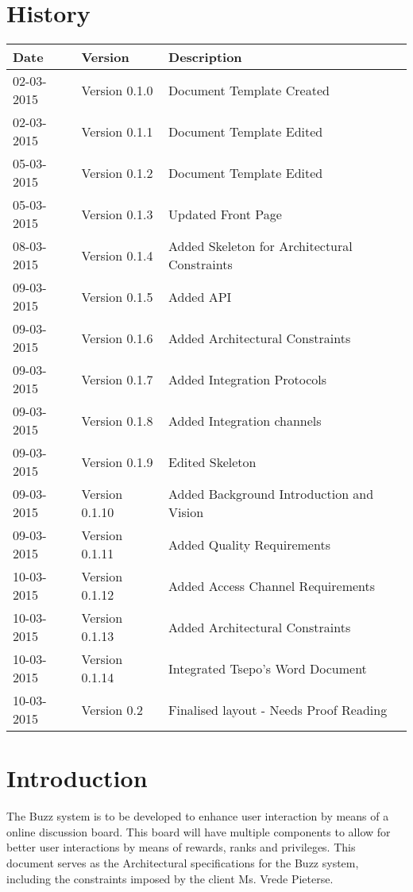 \documentclass[10pt]{article}
\begin{document}


\section{History}
\begin{tabular}{|l|l|l|}

\hline
Date & Version & Description\\ %
\hline
02-03-2015 & Version 0.1.0 & Document Template Created\\ %
02-03-2015 & Version 0.1.1 & Document Template Edited\\ %
05-03-2015 & Version 0.1.2 & Document Template Edited\\ %
05-03-2015 & Version 0.1.3 & Updated Front Page \\ %
08-03-2015 & Version 0.1.4 & Added Skeleton for Architectural Constraints \\ %
09-03-2015 & Version 0.1.5 & Added API \\ %
09-03-2015 & Version 0.1.6 & Added Architectural Constraints \\ %
09-03-2015 & Version 0.1.7 & Added Integration Protocols \\ %
09-03-2015 & Version 0.1.8 & Added Integration channels  \\ %
09-03-2015 & Version 0.1.9 & Edited Skeleton \\ %
09-03-2015 & Version 0.1.10 & Added Background Introduction and Vision \\ %
09-03-2015 & Version 0.1.11 & Added Quality Requirements \\ %
10-03-2015 & Version 0.1.12 & Added Access Channel Requirements \\ %
10-03-2015 & Version 0.1.13 & Added Architectural Constraints \\ %
10-03-2015 & Version 0.1.14 & Integrated Tsepo's Word Document \\ %
10-03-2015 & Version 0.2 & Finalised layout - Needs Proof Reading \\ %
\end{tabular}
\newpage
\tableofcontents
\newpage

\section{Introduction}
The Buzz system is to be developed to enhance user interaction by means of a online discussion board. This board will have multiple components to allow for better user interactions by means of rewards, ranks and privileges. This document serves as the Architectural specifications for the Buzz system, including the constraints imposed by the client Ms. Vrede Pieterse.
\end{document}
